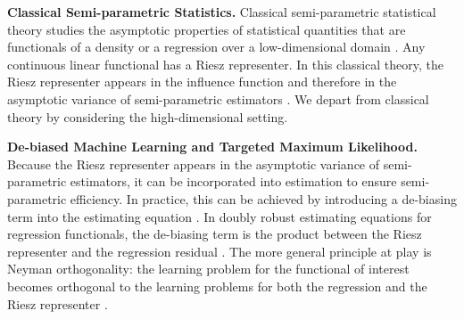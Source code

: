 \textbf{Classical Semi-parametric Statistics.} Classical semi-parametric statistical theory studies the asymptotic properties of statistical quantities that are functionals of a density or a regression over a low-dimensional domain \cite{levit1976efficiency,hasminskii1979nonparametric,ibragimov1981statistical,pfanzagl1982lecture,klaassen1987consistent,robinson1988root,van1991differentiable,bickel1993efficient,newey1994asymptotic,robins1995semiparametric,vaart,bickel1988estimating,newey1998undersmoothing,ai2003efficient,newey2004twicing,ai2007estimation,tsiatis2007semiparametric,kosorok2007introduction,ai2012semiparametric}. Any continuous linear functional has a Riesz representer. In this classical theory, the Riesz representer appears in the influence function and therefore in the asymptotic variance of semi-parametric estimators \cite{newey1994asymptotic}. We depart from classical theory by considering the high-dimensional setting.

\textbf{De-biased Machine Learning and Targeted Maximum Likelihood.} Because the Riesz representer appears in the asymptotic variance of semi-parametric estimators, it can be incorporated into estimation to ensure semi-parametric efficiency. In practice, this can be achieved by introducing a de-biasing term into the estimating equation \cite{hasminskii1979nonparametric,bickel1988estimating,zhang2014confidence,belloni2011inference,belloni2014inference,belloni2014uniform,belloni2014pivotal,javanmard2014confidence,javanmard2014hypothesis,javanmard2018debiasing,van2014asymptotically,ning2017general,chernozhukov2015valid,neykov2018unified,ren2015asymptotic,jankova2015confidence,jankova2016confidence,jankova2018semiparametric,bradic2017uniform,zhu2017breaking,zhu2018linear}. In doubly robust estimating equations for regression functionals, the de-biasing term is the product between the Riesz representer and the regression residual \cite{robins1995analysis,robins1995semiparametric,van2006targeted,van2011targeted,luedtke2016statistical,toth2016tmle}. The more general principle at play is Neyman orthogonality: the learning problem for the functional of interest becomes orthogonal to the learning problems for both the regression and the Riesz representer \cite{neyman1959,neyman1979c,vaart,robins2008higher,zheng2010asymptotic,belloni2014uniform,belloni2014pivotal,chernozhukov2016locally,belloni2017program,chernozhukov2018double,foster2019orthogonal}.

